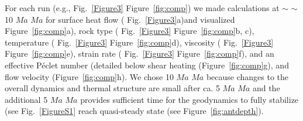 \documentclass[draft,linenumbers]{agujournal2018} %
\providecommand{\DIFaddtex}[1]{{\protect\color{blue} \sf #1}} %
\providecommand{\DIFdeltex}[1]{{\protect\color{red} \scriptsize #1}} %
\providecommand{\DIFaddbegin}{} %
\providecommand{\DIFaddend}{} %
\providecommand{\DIFdelbegin}{} %
\providecommand{\DIFdelend}{} %
\providecommand{\DIFadd}[1]{\texorpdfstring{\DIFaddtex{#1}}{#1}} %
\providecommand{\DIFdel}[1]{\texorpdfstring{\DIFdeltex{#1}}{}} %
\newcommand{\DIFscaledelfig}{0.3}
\newlength{\DIFdelgraphicswidth} %
\newlength{\DIFdelgraphicsheight} %
\newcommand{\DIFaddincludegraphics}[2][]{{\color{blue}\fbox{\DIFOincludegraphics[#1]{#2}}}} %
\newcommand{\DIFdelincludegraphics}[2][]{%
\sbox{\DIFdelgraphicsbox}{\DIFOincludegraphics[#1]{#2}}%
\settoboxwidth{\DIFdelgraphicswidth}{\DIFdelgraphicsbox} %
\settoboxtotalheight{\DIFdelgraphicsheight}{\DIFdelgraphicsbox} %
\scalebox{\DIFscaledelfig}{%
\parbox[b]{\DIFdelgraphicswidth}{\usebox{\DIFdelgraphicsbox}\\[-\baselineskip] \rule{\DIFdelgraphicswidth}{0em}}\llap{\resizebox{\DIFdelgraphicswidth}{\DIFdelgraphicsheight}{%
\setlength{\unitlength}{\DIFdelgraphicswidth}%
\begin{picture}(1,1)%
\thicklines\linethickness{2pt} %
{\color[rgb]{1,0,0}\put(0,0){\framebox(1,1){}}}%
{\color[rgb]{1,0,0}\put(0,0){\line( 1,1){1}}}%
{\color[rgb]{1,0,0}\put(0,1){\line(1,-1){1}}}%
\end{picture}%
}\hspace*{3pt}}} %
} %
\DeclareRobustCommand{\DIFaddbegin}{\DIFOaddbegin \let\includegraphics\DIFaddincludegraphics} %
\DeclareRobustCommand{\DIFaddend}{\DIFOaddend \let\includegraphics\DIFOincludegraphics} %
\DeclareRobustCommand{\DIFdelbegin}{\DIFOdelbegin \let\includegraphics\DIFdelincludegraphics} %
\DeclareRobustCommand{\DIFdelend}{\DIFOaddend \let\includegraphics\DIFOincludegraphics} %
\begin{document}
\DIFaddend For each run (e.g., \DIFdelbegin \DIFdel{Fig.~\ref{Figure3}}\DIFdelend \DIFaddbegin \DIFadd{Figure~\ref{fig:comp}}\DIFaddend ) we made calculations at
\DIFdelbegin \DIFdel{$\sim$}\DIFdelend \DIFaddbegin \DIFadd{\(\sim\) }\DIFaddend 10 \DIFdelbegin \DIFdel{$Ma$ }\DIFdelend \DIFaddbegin \DIFadd{\(Ma\) }\DIFaddend for surface heat flow (\DIFdelbegin \DIFdel{Fig.~\ref{Figure3}a)and visualized }\DIFdelend \DIFaddbegin \DIFadd{Figure~\ref{fig:comp}a), }\DIFaddend rock
type (\DIFdelbegin \DIFdel{Fig.~\ref{Figure3}}\DIFdelend \DIFaddbegin \DIFadd{Figure~\ref{fig:comp}}\DIFaddend b, c), temperature (\DIFdelbegin \DIFdel{Fig.~\ref{Figure3}}\DIFdelend \DIFaddbegin \DIFadd{Figure~\ref{fig:comp}}\DIFaddend d),
viscosity (\DIFdelbegin \DIFdel{Fig.~\ref{Figure3}}\DIFdelend \DIFaddbegin \DIFadd{Figure~\ref{fig:comp}}\DIFaddend e), strain rate
(\DIFdelbegin \DIFdel{Fig.~\ref{Figure3}}\DIFdelend \DIFaddbegin \DIFadd{Figure~\ref{fig:comp}}\DIFaddend f), \DIFdelbegin \DIFdel{and an effective P\'{e}clet number (detailed below}\DIFdelend \DIFaddbegin \DIFadd{shear heating (Figure~\ref{fig:comp}g), and
flow velocity (Figure~\ref{fig:comp}h}\DIFaddend ). We chose 10 \DIFdelbegin \DIFdel{$Ma$ }\DIFdelend \DIFaddbegin \DIFadd{\(Ma\) }\DIFaddend because
changes to the overall dynamics and thermal structure are small after
ca. 5 \DIFdelbegin \DIFdel{$Ma$ }\DIFdelend \DIFaddbegin \DIFadd{\(Ma\) }\DIFaddend and the additional 5 \DIFdelbegin \DIFdel{$Ma$ }\DIFdelend \DIFaddbegin \DIFadd{\(Ma\) }\DIFaddend provides sufficient time for
the geodynamics to \DIFdelbegin \DIFdel{fully stabilize (see
Fig.~\ref{FigureS1}}\DIFdelend \DIFaddbegin \DIFadd{reach quasi-steady state (see
Figure~\ref{fig:antdepth}}\DIFaddend ).
\end{document}
